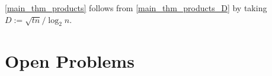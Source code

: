 \documentclass{patmorin}
\renewcommand{\ge}{\geqslant}
\begin{document}
\cref{main_thm_products} follows from \cref{main_thm_products_D} by taking $D:=\sqrt{tn}/\log_2 n$.


\section{Open Problems}

%
%
%
\end{document}
